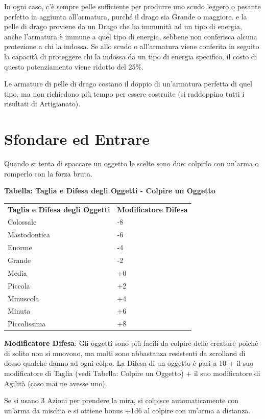 \documentclass[a4paper,11pt,twoside,openany]{book}
\begin{document}
{In ogni caso, c'è sempre pelle sufficiente per produrre uno scudo leggero o pesante perfetto in aggiunta all'armatura, purché il drago sia Grande o maggiore. 
e la pelle di drago proviene da un Drago che ha immunità ad un tipo di energia, anche l'armatura è immune a quel tipo di energia, sebbene non conferisca alcuna protezione a chi la indossa. Se allo scudo o all'armatura viene conferita in seguito la capacità di proteggere chi la indossa da un tipo di energia specifico, il costo di questo potenziamento viene ridotto del 25\%.

Le armature di pelle di drago costano il doppio di un'armatura perfetta di quel tipo, ma non richiedono più tempo per essere costruite (si raddoppino tutti i risultati di Artigianato).

\pagebreak

\section{Sfondare ed Entrare}

\label{sfondare-ed-entrare}

Quando si tenta di spaccare un oggetto le scelte sono due: colpirlo con un'arma o romperlo con la forza bruta.

\textbf{Tabella: Taglia e Difesa degli Oggetti - Colpire un Oggetto}
\medskip

\begin{tabular}{ll}
\toprule
\textbf{Taglia e Difesa degli Oggetti} & \textbf{Modificatore Difesa}\tabularnewline
Colossale & -8\tabularnewline
Mastodontica & -6\tabularnewline
Enorme & -4\tabularnewline
Grande & -2\tabularnewline
Media & +0\tabularnewline
Piccola & +2\tabularnewline
Minuscola & +4\tabularnewline
Minuta & +6\tabularnewline
Piccolissima & +8\tabularnewline
\end{tabular}

\bigskip

\textbf{Modificatore Difesa}: Gli oggetti sono più facili da colpire delle creature poiché di solito non si muovono, ma molti sono abbastanza resistenti da scrollarsi di dosso qualche danno ad ogni colpo. La Difesa di un oggetto è pari a 10 + il suo modificatore di Taglia (vedi Tabella: Colpire un Oggetto) + il suo modificatore di Agilità (caso mai ne avesse uno).

Se si usano 3 Azioni per prendere la mira, si colpisce automaticamente con un'arma da mischia e si ottiene bonus +1d6 al colpire con un'arma a distanza.

}
\end{document}
